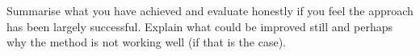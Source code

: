 Summarise what you have achieved and evaluate honestly if you feel the approach
has been largely successful. Explain what could be improved still and perhaps
why the method is not working well (if that is the case).
